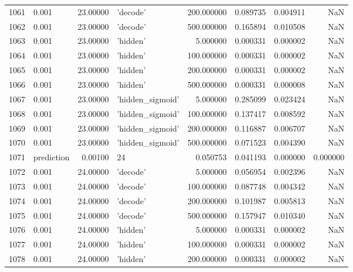 \documentclass[10pt,a4paper]{article}
\begin{document}
\begin{tabular}{llrlrrrr}
1061 &       0.001 &  23.00000 &           'decode' &  200.000000 &  0.089735 &  0.004911 &       NaN \\
1062 &       0.001 &  23.00000 &           'decode' &  500.000000 &  0.165894 &  0.010508 &       NaN \\
1063 &       0.001 &  23.00000 &           'hidden' &    5.000000 &  0.000331 &  0.000002 &       NaN \\
1064 &       0.001 &  23.00000 &           'hidden' &  100.000000 &  0.000331 &  0.000002 &       NaN \\
1065 &       0.001 &  23.00000 &           'hidden' &  200.000000 &  0.000331 &  0.000002 &       NaN \\
1066 &       0.001 &  23.00000 &           'hidden' &  500.000000 &  0.000331 &  0.000008 &       NaN \\
1067 &       0.001 &  23.00000 &   'hidden\_sigmoid' &    5.000000 &  0.285099 &  0.023424 &       NaN \\
1068 &       0.001 &  23.00000 &   'hidden\_sigmoid' &  100.000000 &  0.137417 &  0.008592 &       NaN \\
1069 &       0.001 &  23.00000 &   'hidden\_sigmoid' &  200.000000 &  0.116887 &  0.006707 &       NaN \\
1070 &       0.001 &  23.00000 &   'hidden\_sigmoid' &  500.000000 &  0.071523 &  0.004390 &       NaN \\
1071 &  prediction &   0.00100 &                 24 &    0.050753 &  0.041193 &  0.000000 &  0.000000 \\
1072 &       0.001 &  24.00000 &           'decode' &    5.000000 &  0.056954 &  0.002396 &       NaN \\
1073 &       0.001 &  24.00000 &           'decode' &  100.000000 &  0.087748 &  0.004342 &       NaN \\
1074 &       0.001 &  24.00000 &           'decode' &  200.000000 &  0.101987 &  0.005813 &       NaN \\
1075 &       0.001 &  24.00000 &           'decode' &  500.000000 &  0.157947 &  0.010340 &       NaN \\
1076 &       0.001 &  24.00000 &           'hidden' &    5.000000 &  0.000331 &  0.000002 &       NaN \\
1077 &       0.001 &  24.00000 &           'hidden' &  100.000000 &  0.000331 &  0.000002 &       NaN \\
1078 &       0.001 &  24.00000 &           'hidden' &  200.000000 &  0.000331 &  0.000002 &       NaN \\

\end{tabular}
\end{document}
